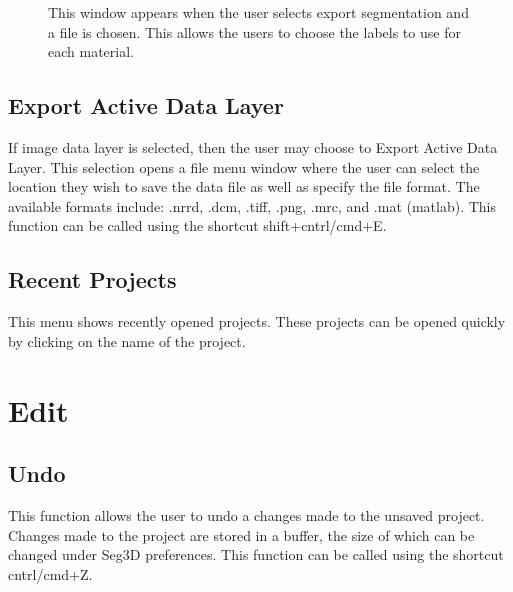 \documentclass[fleqn,11pt,openany]{book}
\begin{document}
\begin{figure}[h!]
\caption{This window appears when the user selects export segmentation and a file is chosen.  This allows the users to choose the labels to use for each material.  }\label{fig:ExportSeg_2}
\end{figure}

\subsection{Export Active Data Layer}

If image data layer is selected, then the user may choose to Export Active Data Layer. This selection opens a file menu window where the user can select the location they wish to save the data file as well as specify the file format.  The available formats include: .nrrd, .dcm, .tiff, .png, .mrc, and .mat (matlab). This function can be called using the shortcut shift+cntrl/cmd+E.

\subsection{Recent Projects}
This menu shows recently opened projects.  These projects can be opened quickly by clicking on the name of the project.

\section{Edit}

\subsection{Undo}
This function allows the user to undo a changes made to the unsaved project.  Changes made to the project are stored
in a buffer, the size of which can be changed under Seg3D preferences. This function can be called using the shortcut cntrl/cmd+Z.
\end{document}
